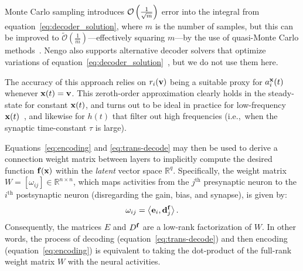 Monte Carlo sampling introduces $\mathcal{O}\left({ \frac{1}{\sqrt{m}} }\right)$ error into the integral from equation~\ref{eq:decoder_solution}, where $m$ is the number of samples, but this can be improved to $\widetilde{\mathcal{O}} \left( \frac{1}{m} \right)$---effectively squaring $m$---by the use of quasi-Monte Carlo methods~\citep{fang1994, voelker2016b}.
Nengo also supports alternative decoder solvers that optimize variations of equation~\ref{eq:decoder_solution}~\citep[e.g.,][]{voelker2016a, abrams2017}, but we do not use them here.


The accuracy of this approach relies on $r_i(\mathbf{v})$ being a suitable proxy for $a_i^{\mathbf{x}}(t)$ whenever $\mathbf{x}(t) = \mathbf{v}$.
This zeroth-order approximation clearly holds in the steady-state for constant $\mathbf{x}(t)$, and turns out to be ideal in practice for low-frequency $\mathbf{x}(t)$~\citep[][appendix~F.1]{eliasmith2003a}, and likewise for $h(t)$ that filter out high frequencies (i.e.,~when the synaptic time-constant $\tau$ is large).

Equations~\ref{eq:encoding} and \ref{eq:trans-decode} may then be used to derive a connection weight matrix between layers to implicitly compute the desired function $\mathbf{f}(\mathbf{x})$ within the \emph{latent} vector space $\mathbb{R}^q$.
Specifically, the weight matrix $W = [\omega_{ij}] \in \mathbb{R}^{n \times n}$, which maps activities from the $j^{\text{th}}$ presynaptic neuron to the $i^{\text{th}}$ postsynaptic neuron (disregarding the gain, bias, and synapse), is given by:
\begin{equation} \label{eq:factored-weights}
\omega_{ij} = \left\langle \V{e}_i, \V{d}^\V{f}_j \right\rangle \text{.} %
\end{equation}
Consequently, the matrices $E$ and $D^{\mathbf{f}}$ are a low-rank factorization of $W$.
In other words, the process of decoding (equation~\ref{eq:trans-decode}) and then encoding (equation~\ref{eq:encoding}) is equivalent to taking the dot-product of the full-rank weight matrix $W$ with the neural activities.

